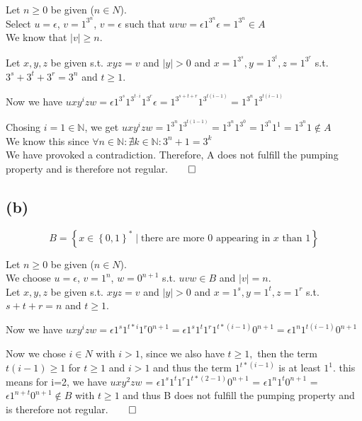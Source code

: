 Let $n \geq 0$ be given ($n \in N $).\\
Select $u = \epsilon$, $v=1^{3^{n}}$, $v=\epsilon$ such that $uvw = \epsilon 1^{3^{n}} \epsilon = 1^{3^{n}} \in A$\\
We know that $\lvert v \rvert \geq n$.

Let $x,y,z$ be given s.t. $xyz=v$ and $|y| > 0$ and $x=1^{3^{s}},y=1^{3^{t}},z=1^{3^{r}} $ s.t. $ 3^{s}+3^{t}+3^{r} = 3^{n} $ and $ t\geq 1$.

Now we have $uxy^izw = \epsilon 1^{3^{s}} 1^{3^{t\cdot i}} 1^{3^{r}} \epsilon = 1^{3^{s+t+r}} 1^{3^{t(i-1)}} = 1^{3^{n}}1^{3^{t(i-1)}}$

Chosing $i=1 \in \mathbb{N}$, we get $uxy^izw = 1^{3^{n}}1^{3^{t(1-1)}} = 1^{3^{n}}1^{3^{0}} = 1^{3^{n}}1^{1} = 1^{3^{n}}1 \notin A$\\
We know this since $\forall n \in \mathbb{N}: \nexists k \in \mathbb{N}: 3^{n} + 1 = 3^{k}$\\
We have provoked a contradiction. Therefore, A does not fulfill the pumping property and is therefore not regular.$\qed$

\subsection{(b)}

$$
B = \left\{ x \in \left\{0,1\right\}^{\ast} \mid \text{there are more }0\text{ appearing in }x\text{ than }1\right\}
$$

Let $n \geq 0$ be given ($n \in N $).\\
We choose $u = \epsilon$, $v= 1^n$, $w= 0^{n+1}$ s.t. $uvw \in B$ and $|v| = n$.\\
Let $x,y,z$ be given s.t. $xyz=v$ and $|y| > 0$ and $x=1^s,y=1^t,z=1^r $ s.t. $ s+t+r = n $ and $ t \geq 1$.

Now we have $uxy^izw = \epsilon 1^s 1^{t*i} 1^r 0^{n+1} = \epsilon 1^s 1^t 1^r 1^{t * (i-1)} 0^{n+1} = \epsilon 1^n 1^{t(i-1)}0^{n+1}$

Now we chose $i \in N$ with $i > 1$, since we also have $t \geq 1, $ then the term $t(i-1) \geq 1$ for $t \geq 1$ and $i > 1$ and thus the term $1^{t * (i-1)}$ is at least $1^1$. this means for i=2, we have  $uxy^2zw$ = $\epsilon 1^s 1^t 1^r 1^{t * (2-1)} 0^{n+1}$ = $\epsilon 1^n 1^{t}0^{n+1}$ = $\epsilon 1^{n + t}0^{n+1} \notin B$ with $t\geq1$ and thus B does not fulfill the pumping property and is therefore not regular.$\qed$


